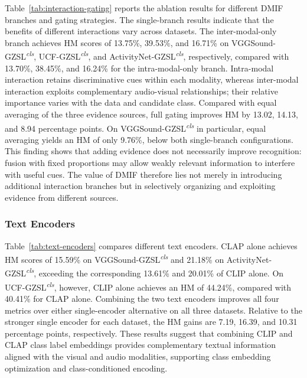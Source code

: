 Table~\ref{tab:interaction-gating} reports the ablation results for different DMIF branches and gating strategies. The single-branch results indicate that the benefits of different interactions vary across datasets. The inter-modal-only branch achieves HM scores of 13.75\%, 39.53\%, and 16.71\% on VGGSound-GZSL\textsuperscript{\textit{cls}}, UCF-GZSL\textsuperscript{\textit{cls}}, and ActivityNet-GZSL\textsuperscript{\textit{cls}}, respectively, compared with 13.70\%, 38.45\%, and 16.24\% for the intra-modal-only branch. Intra-modal interaction retains discriminative cues within each modality, whereas inter-modal interaction exploits complementary audio-visual relationships; their relative importance varies with the data and candidate class. Compared with equal averaging of the three evidence sources, full gating improves HM by 13.02, 14.13, and 8.94 percentage points. On VGGSound-GZSL\textsuperscript{\textit{cls}} in particular, equal averaging yields an HM of only 9.76\%, below both single-branch configurations. This finding shows that adding evidence does not necessarily improve recognition: fusion with fixed proportions may allow weakly relevant information to interfere with useful cues. The value of DMIF therefore lies not merely in introducing additional interaction branches but in selectively organizing and exploiting evidence from different sources.

\subsubsection{Text Encoders}\label{sec:text-encoders}


Table~\ref{tab:text-encoders} compares different text encoders. CLAP alone achieves HM scores of 15.59\% on VGGSound-GZSL\textsuperscript{\textit{cls}} and 21.18\% on ActivityNet-GZSL\textsuperscript{\textit{cls}}, exceeding the corresponding 13.61\% and 20.01\% of CLIP alone. On UCF-GZSL\textsuperscript{\textit{cls}}, however, CLIP alone achieves an HM of 44.24\%, compared with 40.41\% for CLAP alone. Combining the two text encoders improves all four metrics over either single-encoder alternative on all three datasets. Relative to the stronger single encoder for each dataset, the HM gains are 7.19, 16.39, and 10.31 percentage points, respectively. These results suggest that combining CLIP and CLAP class label embeddings provides complementary textual information aligned with the visual and audio modalities, supporting class embedding optimization and class-conditioned encoding.

